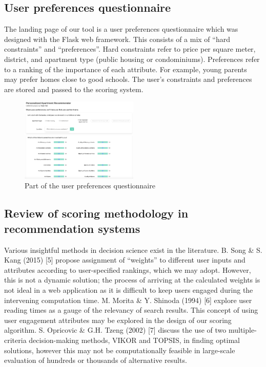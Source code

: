 \documentclass[a4paper, 11pt]{article}
\begin{document}

    \subsection{User preferences questionnaire}

    The landing page of our tool is a user preferences questionnaire which was designed with the Flask web framework. This consists of a mix of “hard constraints” and “preferences”. Hard constraints refer to price per square meter, district, and apartment type (public housing or condominiums). Preferences refer to a ranking of the importance of each attribute. For example, young parents may prefer homes close to good schools. The user's constraints and preferences are stored and passed to the scoring system.

   \begin{figure}[h]
   \centering
   \includegraphics[width={0.5\textwidth}]{questionnaire.png}
   \caption{Part of the user preferences questionnaire}
   \end{figure}

    \subsection{Review of scoring methodology in recommendation systems}
    Various insightful methods in decision science exist in the literature. B. Song \& S. Kang (2015) [5] propose assignment of “weights” to different user inputs and attributes according to user-specified rankings, which we may adopt. However, this is not a dynamic solution; the process of arriving at the calculated weights is not ideal in a web application as it is difficult to keep users engaged during the intervening computation time. M. Morita \& Y. Shinoda (1994) [6] explore user reading times as a gauge of the relevancy of search results. This concept of using user engagement attributes may be explored in the design of our scoring algorithm. S. Opricovic \& G.H. Tzeng (2002) [7] discuss the use of two multiple-criteria decision-making methods, VIKOR and TOPSIS, in finding optimal solutions, however this may not be computationally feasible in large-scale evaluation of hundreds or thousands of alternative results.
\end{document}
